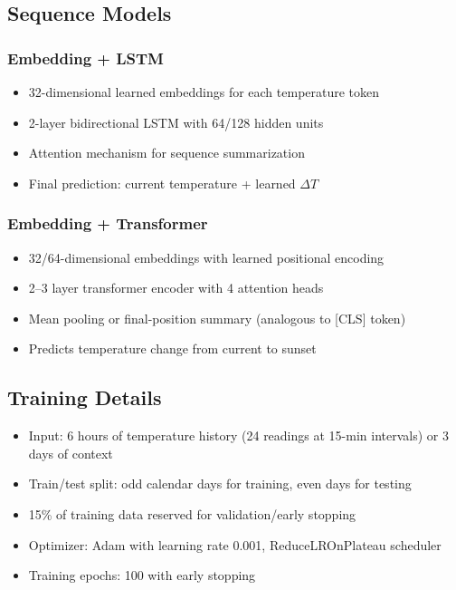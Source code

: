 \documentclass[11pt]{article}
\begin{document}
\subsection{Sequence Models}

\subsubsection{Embedding + LSTM}
\begin{itemize}
    \item 32-dimensional learned embeddings for each temperature token
    \item 2-layer bidirectional LSTM with 64/128 hidden units
    \item Attention mechanism for sequence summarization
    \item Final prediction: current temperature + learned $\Delta T$
\end{itemize}

\subsubsection{Embedding + Transformer}
\begin{itemize}
    \item 32/64-dimensional embeddings with learned positional encoding
    \item 2--3 layer transformer encoder with 4 attention heads
    \item Mean pooling or final-position summary (analogous to [CLS] token)
    \item Predicts temperature change from current to sunset
\end{itemize}

\subsection{Training Details}
\begin{itemize}
    \item Input: 6 hours of temperature history (24 readings at 15-min intervals) or 3 days of context
    \item Train/test split: odd calendar days for training, even days for testing
    \item 15\% of training data reserved for validation/early stopping
    \item Optimizer: Adam with learning rate 0.001, ReduceLROnPlateau scheduler
    \item Training epochs: 100 with early stopping
\end{itemize}
\end{document}
